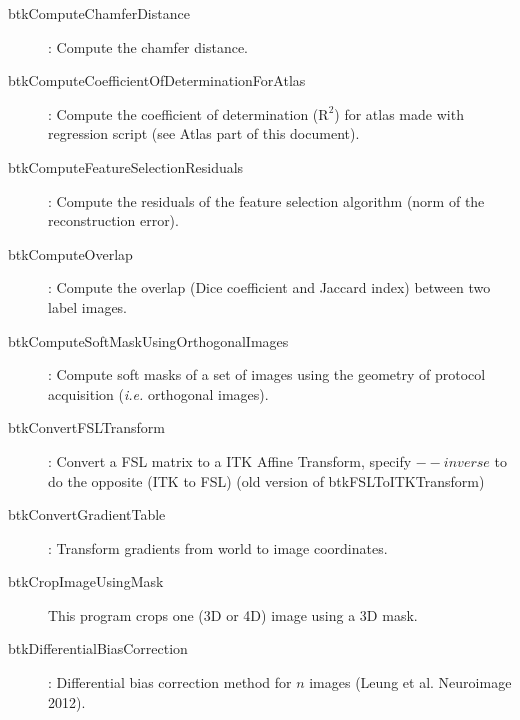 \begin{description}
\item[btkComputeChamferDistance]: Compute the chamfer distance.
\item[btkComputeCoefficientOfDeterminationForAtlas]: Compute the coefficient of determination ($\text{R}^2$) for atlas made with regression script (see Atlas part of this document).
\item[btkComputeFeatureSelectionResiduals]: Compute the residuals of the feature selection algorithm (norm of the reconstruction error).
\item[btkComputeOverlap]: Compute the overlap (Dice coefficient and Jaccard index) between two label images.
\item[btkComputeSoftMaskUsingOrthogonalImages]: Compute soft masks of a set of images using the geometry of protocol acquisition (\textit{i.e.} orthogonal images).
\item[btkConvertFSLTransform]: Convert a FSL matrix to a ITK Affine Transform, specify $--inverse$ to do the opposite (ITK to FSL) (old version of btkFSLToITKTransform)
\item[btkConvertGradientTable]: Transform gradients from world to image coordinates.
\item[btkCropImageUsingMask] This program crops one (3D or 4D) image using a 3D mask.
\item[btkDifferentialBiasCorrection]: Differential bias correction method for $n$ images (Leung et al. Neuroimage 2012). 

\end{description}
